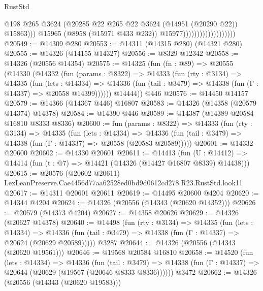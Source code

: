\begin{lexlean}{RustStd}
\begin{coremodule}
                                              @198
                                              @265
                                              @3624
                                              (@20285
                                                @22
                                                @265
                                                @22
                                                @3624
                                                (@14951 (@20290 @22))
                                                @15863)))
                                          @15965
                                          (@8958 (@15971 @433 @232))
                                          @15977)))))))))))))))))))
@20549 := @14309 @280
@20553 := @14311 (@14315 @280) (@14321 @280)
@20555 := @14326 (@14155 @14327)
@20556 := @8329 @12342
@20558 := @14326 (@20556 @14354)
@20575 := @14325
    (fun (fn : @89) =>
    @20555
      (@14330
        (@14332
          (fun (params : @8322) =>
          @14333
            (fun (rty : @3134) =>
            @14335
              (fun (lets : @14334) =>
              @14336 (fun (tail : @3479) => @14338 (fun (Γ : @14337) => @20558 @14399))))))
        @14444))
    @446
@20576 := @14450 @14157
@20579 := @14366 (@14367 @446) @16807
@20583 := @14326 (@14358 (@20579 @14374) @14378)
@20584 := @14390 @446
@20589 := @14387 (@14389 @20584 @16810 @8333 @8336)
@20600 := fun (params : @8322) =>
  @14333
    (fun (rty : @3134) =>
    @14335
      (fun (lets : @14334) =>
      @14336 (fun (tail : @3479) => @14338 (fun (Γ : @14337) => @20558 (@20583 @20589)))))
@20601 := @14332 @20600
@20602 := @14330 @20601
@20611 := @14413
    (fun (U : @14412) => @14414 (fun (t : @7) => @14421 (@14326 (@14427 @16807 @8339) @14438)))
@20615 := @20576
    (@20602 @20611)
    LexLeanPreserve.Cae4456d77aa62528ed0bd9d0612cd278.R23.RustStd.look11
@20617 := @14311 @20601 @20611
@20619 := @14495 @20600 @4204
@20620 := @14344 @4204
@20624 := @14326 (@20556 (@14343 (@20620 @14352)))
@20626 := @20579 (@14373 @4204)
@20627 := @14358 @20626
@20629 := @14326 (@20627 @14378)
@20640 := @14498
    (fun (rty : @3134) =>
    @14335
      (fun (lets : @14334) =>
      @14336 (fun (tail : @3479) => @14338 (fun (Γ : @14337) => @20624 (@20629 @20589)))))
    @3287
@20644 := @14326 (@20556 (@14343 (@20620 @19561)))
@20646 := @19568 @20584 @16810
@20658 := @14520
    (fun (lets : @14334) =>
    @14336
      (fun (tail : @3479) =>
      @14338 (fun (Γ : @14337) => @20644 (@20629 (@19567 (@20646 @8333 @8336))))))
    @3472
@20662 := @14326 (@20556 (@14343 (@20620 @19583)))

\end{coremodule}
\end{lexlean}
